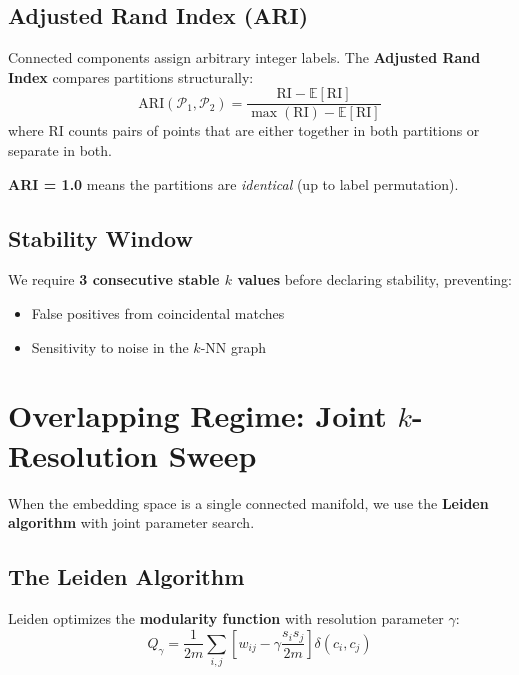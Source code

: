 \documentclass[11pt,a4paper]{article}
\newcommand{\set}[1]{\mathcal{#1}}
\newcommand{\E}{\mathbb{E}}
\begin{document}
\subsection{Adjusted Rand Index (ARI)}

Connected components assign arbitrary integer labels. The \textbf{Adjusted Rand Index} compares partitions structurally:
\begin{equation}
    \text{ARI}(\set{P}_1, \set{P}_2) = \frac{\text{RI} - \E[\text{RI}]}{\max(\text{RI}) - \E[\text{RI}]}
\end{equation}
where RI counts pairs of points that are either together in both partitions or separate in both.

\textbf{ARI = 1.0} means the partitions are \textit{identical} (up to label permutation).

\subsection{Stability Window}

We require \textbf{3 consecutive stable $k$ values} before declaring stability, preventing:
\begin{itemize}
    \item False positives from coincidental matches
    \item Sensitivity to noise in the $k$-NN graph
\end{itemize}

\section{Overlapping Regime: Joint $k$-Resolution Sweep}

When the embedding space is a single connected manifold, we use the \textbf{Leiden algorithm} with joint parameter search.

\subsection{The Leiden Algorithm}

Leiden optimizes the \textbf{modularity function} with resolution parameter $\gamma$:
\begin{equation}
    Q_\gamma = \frac{1}{2m} \sum_{i,j} \left[ w_{ij} - \gamma \frac{s_i s_j}{2m} \right] \delta(c_i, c_j)
\end{equation}
\end{document}
